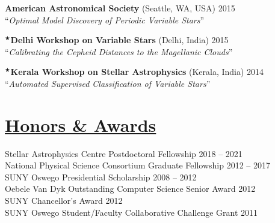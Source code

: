   \vspace{1mm}
  \noindent \hphantom{$^{\scriptscriptstyle\bigstar}$}\textbf{American Astronomical Society} (Seattle, WA, USA) \hfill{2015} \\
  \hphantom{$^{\scriptscriptstyle\bigstar}$}``\emph{Optimal Model Discovery of Periodic Variable Stars}''
  
  \vspace{1mm}
  \noindent $^{\scriptscriptstyle\bigstar}$\textbf{Delhi Workshop on Variable Stars} (Delhi, India) \hfill{2015} \\
  \hphantom{$^{\scriptscriptstyle\bigstar}$}``\emph{Calibrating the Cepheid Distances to the Magellanic Clouds}''
  
  \vspace{1mm}
  \noindent $^{\scriptscriptstyle\bigstar}$\textbf{Kerala Workshop on Stellar Astrophysics} (Kerala, India) \hfill{2014} \\
  \hphantom{$^{\scriptscriptstyle\bigstar}$}``\emph{Automated Supervised Classification of Variable Stars}''
  
  
  
  
  
  
  \section*{\sc\underline{Honors \& Awards}}
  \vspace*{-2mm}
  Stellar Astrophysics Centre Postdoctoral Fellowship \hfill 2018 -- 2021\vspace{1mm}\\
  National Physical Science Consortium Graduate Fellowship    \hfill 2012 -- 2017\vspace{1mm}\\
  SUNY Oswego Presidential Scholarship                        \hfill 2008 -- 2012\vspace{1mm}\\
  Oebele Van Dyk Outstanding Computer Science Senior Award    \hfill 2012\vspace{1mm}\\
  SUNY Chancellor's Award %
  \hfill 2012\vspace{1mm}\\
  SUNY Oswego Student/Faculty Collaborative Challenge Grant   \hfill 2011%
  